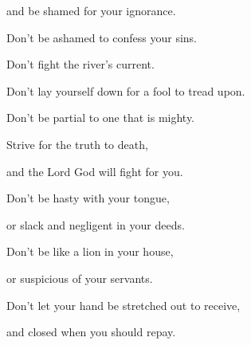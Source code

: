 {\par }{\Q and be shamed for your ignorance.
\par }{\Q {}Don’t be ashamed to confess your sins.
\par }{\QB Don’t fight the river’s current.
\par }{\Q {}Don’t lay yourself down for a fool to tread upon.
\par }{\QB Don’t be partial to one that is mighty.
\par }{\Q {}Strive for the truth to death,
\par }{\QB and the Lord God will fight for you.
\par }{\BB \par }{\Q {}Don’t be hasty with your tongue,
\par }{\QB or slack and negligent in your deeds.
\par }{\Q {}Don’t be like a lion in your house,
\par }{\QB or suspicious of your servants.
\par }{\Q {}Don’t let your hand be stretched out to receive,
\par }{\QB and closed when you should repay.

}
